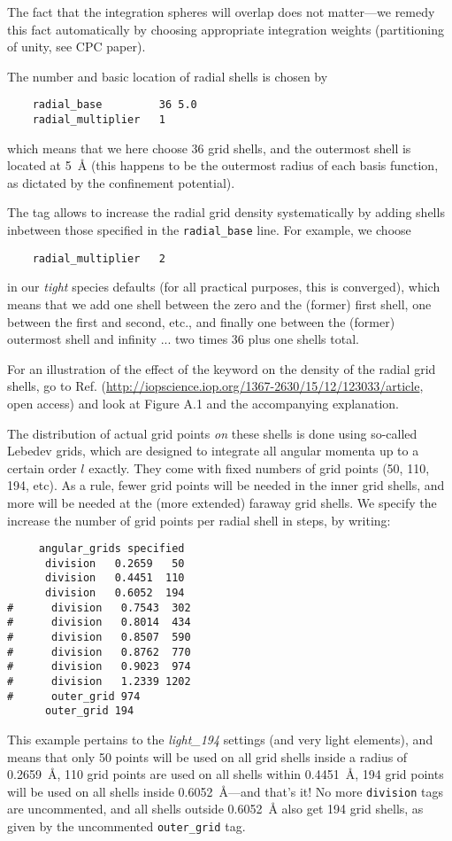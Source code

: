 The fact that the integration spheres will overlap does not matter---we remedy
this fact automatically by choosing appropriate integration weights
(partitioning of unity, see CPC paper).

The number and basic location of radial shells is chosen by
\begin{verbatim}
    radial_base         36 5.0
    radial_multiplier   1
\end{verbatim}
which means that we here choose 36 grid shells, and the outermost shell is
located at 5~{\AA} (this happens to be the outermost radius of each basis
function, as dictated by the confinement potential).

The  tag allows to increase the radial grid density
systematically by adding shells inbetween those specified in the
\texttt{radial\_base} line. For example, we choose 
\begin{verbatim}
    radial_multiplier   2
\end{verbatim}
in our \emph{tight} species defaults (for all practical purposes, this is
converged), which means that we add one shell between the zero and the
(former) first shell, one between the first and second, etc., and finally one
between the (former) outermost shell and infinity ... two times 36 plus one
shells total.

For an
illustration of the effect of the
 keyword on the density of the
radial grid shells, go to Ref. \cite{Zhang2013}
(\url{http://iopscience.iop.org/1367-2630/15/12/123033/article}, open
access) and look at Figure A.1 and the accompanying explanation. 

The distribution of actual grid points \emph{on} these shells is done using
so-called Lebedev grids, which are designed to integrate all angular
momenta up to a certain order $l$ exactly. They come with fixed numbers of grid
points (50, 110, 194, etc). As a rule, fewer grid points will be needed in the
inner grid shells, and more will be needed at the (more extended) faraway grid
shells. We specify the increase the number of grid points per radial shell in
steps, by writing:
\begin{verbatim}
     angular_grids specified
      division   0.2659   50
      division   0.4451  110
      division   0.6052  194
#      division   0.7543  302
#      division   0.8014  434
#      division   0.8507  590
#      division   0.8762  770
#      division   0.9023  974
#      division   1.2339 1202
#      outer_grid 974
      outer_grid 194
\end{verbatim}
This example pertains to the \emph{light\_194} settings (and very light
elements), and means that only 
50 points will be used on all grid shells inside a radius of 0.2659~{\AA}, 110
grid points are used on all shells within 0.4451~{\AA}, 194 grid points will
be used on all shells inside 0.6052~{\AA}---and that's it! No more
\texttt{division} tags are uncommented, and all shells outside 0.6052~{\AA}
also get 194 grid shells, as given by the uncommented \texttt{outer\_grid}
tag. 

